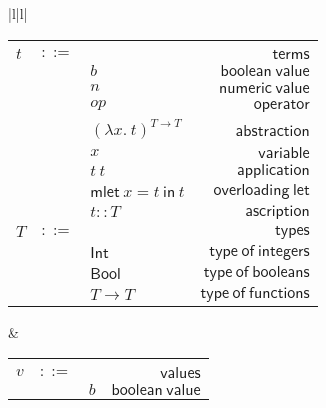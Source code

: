 \documentclass[preprint,authoryear,sort&compress,9pt,nocopyrightspace]{article}
\newcommand{\ascrip}[1]{#1::T}
\newcommand{\oletP}[3]{\mathsf{mlet} \ x = #2 \ \mathsf{in}  \ #3}
\newcommand{\app}[2]{#1 \ #2}
\newcommand{\negacion}[1]{\mathsf{not} \ #1}
\newcommand{\suma}[1]{\mathsf{add1} \ #1}
\newcommand{\absSTT}[2]{(\lambda #1. \ #2)^{T \to T}}
\newcommand{\truet}{\mathsf{true}}
\newcommand{\falset}{\mathsf{false}}
\newcommand{\boolt}{\mathsf{Bool}}
\newcommand{\intt}{\mathsf{Int}}
\begin{document}
\begin{figure}
\begin{small}
\begin{center}
\hspace*{-2cm}
\begin{tabular}{|l|l|}
\hline
\begin{tabular}{l c l r}
&&&\\
$t$&$::=$&&$\mathsf {terms}$\\
&&$b$&$\mathsf {boolean \ value}$\\
&&$n$&$\mathsf {numeric \ value}$\\
&&$op$&$\mathsf{operator}$\\
&&$\absSTT {x}{t}$&\ $\mathsf {abstraction}$\\
&&$x$&$\mathsf {variable}$\\
&&$\app {t}{t}$&$\mathsf {application}$\\
&&$\oletP{T}{t}{t}$&$\mathsf {overloading \ let}$\\
&&$\ascrip {t}$&$\mathsf {ascription}$\\
$T$&$::=$&&$\mathsf {types}$\\
&&$\intt$&$\mathsf {type \ of \ integers}$\\
&&$\boolt$&$\mathsf {type \ of \ booleans}$\\
&&$T \to T$&$\mathsf {type \ of \ functions}$\\
\end{tabular}
& \begin{tabular}{l c l r}
&&&\\
$v$&$::=$&&$\mathsf {values}$\\
&&$b$&$\mathsf {boolean \ value}$\\

\end{tabular}
\end{tabular}
\end{center}
\end{small}
\end{figure}
\end{document}
